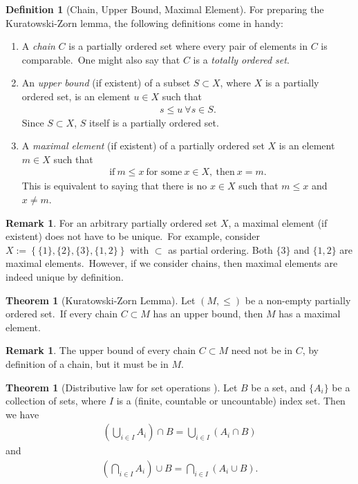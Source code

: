\documentclass[12pt, a4paper]{article}
\numberwithin{equation}{section}
\theoremstyle{definition}
\theoremstyle{definition}
\newtheorem{defn}[thm]{Definition} %
\newtheorem{remark}[thm]{Remark} %
\newtheorem{theorem}[thm]{Theorem}
\begin{document}
	\begin{defn}[Chain, Upper Bound, Maximal Element]
	For preparing the Kuratowski-Zorn lemma, the following definitions come in handy: 
		\begin{enumerate}[label=\alph*)]
			\item A \textit{chain} $C$ is a partially ordered set where every pair of elements in $C$ is comparable.\ One might also say that $C$ is a \textit{totally ordered set}. 
			\item An \textit{upper bound} (if existent)  of a subset $S\subset X$, where $X$ is a partially ordered set, is an element $u\in X$ such that 
			\begin{align}
				s \leq u \ \forall s\in S. 
			\end{align}
			Since $S\subset X$, $S$ itself is a partially ordered set. 
			\item A \textit{maximal element} (if existent) of a partially ordered set $X$ is an element $m\in X$ such that 
			\begin{align}
				\text{if}\ m\leq x \ \text{for some}\ x\in X,\ \text{then}\ x=m.
			\end{align}
			This is equivalent to saying that there is no $x\in X$ such that $m\leq x$ and $x\ne m$. 
		\end{enumerate}
	\end{defn}

	\begin{remark}
		For an arbitrary partially ordered set $X$, a maximal element (if existent) does not have to be unique.\ For example, consider $X := \left\{ \{1\}, \{2\}, \{3\}, \{1, 2\} \right\}$ with $\subset$ as partial ordering. Both $\{3\}$ and $\{1, 2\}$ are maximal elements.\ However, if we consider chains, then maximal elements are indeed unique by definition. 
	\end{remark}

	\begin{theorem}[Kuratowski-Zorn Lemma]
		Let $\left(M, \leq\right)$ be a non-empty partially ordered set.\ If every chain $C\subset M$ has an upper bound, then $M$ has a maximal element. 
	\end{theorem}

	\begin{remark}
		The upper bound of every chain $C\subset M$ need not be in $C$, by definition of a chain, but it must be in $M$. 
	\end{remark}

	\begin{theorem}[Distributive law for set operations \cite{481036}]
		Let $B$ be a set, and $\{A_i\}$ be a collection of sets, where $I$ is a (finite, countable or uncountable) index set. Then we have
		\begin{align}\label{eq:dist_law_set_ops}
			\left(\bigcup_{i\in I} A_i\right) \cap B = \bigcup_{i\in I}(A_i \cap B)
		\end{align}
		and 
		\begin{align}\label{eq:dist_law_set_ops_2}
			\left(\bigcap_{i\in I}A_i\right) \cup B = \bigcap_{i\in I}(A_i \cup B).
		\end{align}
	\end{theorem}
\end{document}

